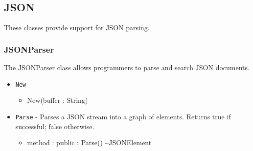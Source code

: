 \documentclass[11pt]{article}
\begin{document}
\subsection{JSON}
These classes provide support for JSON parsing.

\subsubsection{JSONParser}
The JSONParser class allows programmers to parse and search JSON documents.
\begin{itemize}
  \item \texttt{New}
    \begin{itemize}
    \item New(buffer : String)
    \end{itemize}
  \item \texttt{Parse} - Parses a JSON stream into a graph of elements.
    Returns true if successful; false otherwise.
    \begin{itemize}
    \item method : public : Parse() \textasciitilde JSONElement
    \end{itemize}
\end{itemize}
\end{document}
